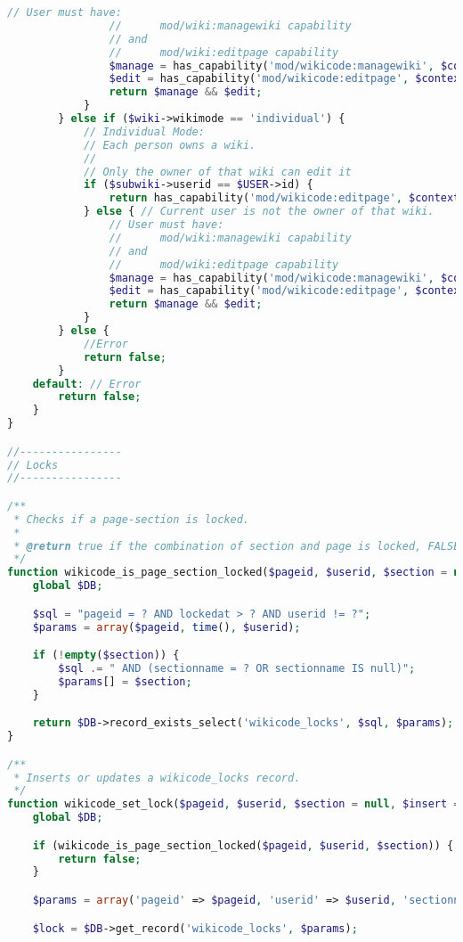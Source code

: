 \begin{lstlisting}[language=PHP]
                // User must have:
                //      mod/wiki:managewiki capability
                // and
                //      mod/wiki:editpage capability
                $manage = has_capability('mod/wikicode:managewiki', $context);
                $edit = has_capability('mod/wikicode:editpage', $context);
                return $manage && $edit;
            }
        } else if ($wiki->wikimode == 'individual') {
            // Individual Mode:
            // Each person owns a wiki.
            //
            // Only the owner of that wiki can edit it
            if ($subwiki->userid == $USER->id) {
                return has_capability('mod/wikicode:editpage', $context);
            } else { // Current user is not the owner of that wiki.
                // User must have:
                //      mod/wiki:managewiki capability
                // and
                //      mod/wiki:editpage capability
                $manage = has_capability('mod/wikicode:managewiki', $context);
                $edit = has_capability('mod/wikicode:editpage', $context);
                return $manage && $edit;
            }
        } else {
            //Error
            return false;
        }
    default: // Error
        return false;
    }
}

//----------------
// Locks
//----------------

/**
 * Checks if a page-section is locked.
 *
 * @return true if the combination of section and page is locked, FALSE otherwise.
 */
function wikicode_is_page_section_locked($pageid, $userid, $section = null) {
    global $DB;

    $sql = "pageid = ? AND lockedat > ? AND userid != ?";
    $params = array($pageid, time(), $userid);

    if (!empty($section)) {
        $sql .= " AND (sectionname = ? OR sectionname IS null)";
        $params[] = $section;
    }

    return $DB->record_exists_select('wikicode_locks', $sql, $params);
}

/**
 * Inserts or updates a wikicode_locks record.
 */
function wikicode_set_lock($pageid, $userid, $section = null, $insert = false) {
    global $DB;

    if (wikicode_is_page_section_locked($pageid, $userid, $section)) {
        return false;
    }

    $params = array('pageid' => $pageid, 'userid' => $userid, 'sectionname' => $section);

    $lock = $DB->get_record('wikicode_locks', $params);


\end{lstlisting}
